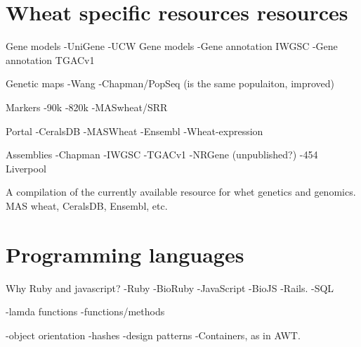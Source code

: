 



\section{Wheat specific resources resources}
\label{lit:wheatResourcers}
Gene models
-UniGene
-UCW Gene models
-Gene annotation IWGSC
-Gene annotation TGACv1

Genetic maps
-Wang
-Chapman/PopSeq (is the same populaiton, improved)

Markers
-90k
-820k
-MASwheat/SRR

Portal
-CeralsDB
-MASWheat
-Ensembl
-Wheat-expression

Assemblies
-Chapman
-IWGSC
-TGACv1
-NRGene (unpublished?)
-454 Liverpool

A compilation of the currently available resource for whet genetics and genomics. MAS wheat, CeralsDB, Ensembl, etc.  

\section{Programming languages}
Why Ruby and javascript?
-Ruby
-BioRuby
-JavaScript
-BioJS
-Rails. 
-SQL

-lamda functions
-functions/methods

-object orientation
-hashes
-design patterns
 -Containers, as in AWT. 

 \label{lit:patterns}